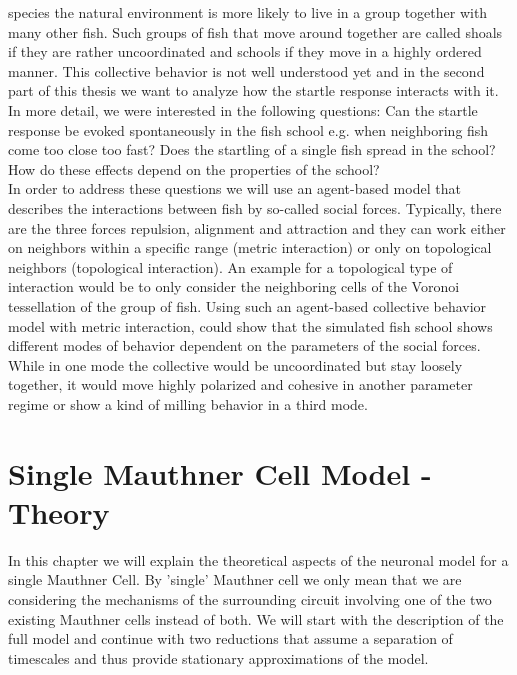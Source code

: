 \documentclass[a4paper,10pt,hidelinks]{scrreprt}
\begin{document}
	species the natural environment is more likely to live in a group together with many other fish.
	Such groups of fish that move around together are called shoals if they are rather 
	uncoordinated and schools if they move in a highly ordered manner.
	This collective behavior is not well understood yet and in the second part of this thesis we 
	want to analyze how the startle response interacts with it.
	In more detail, we were interested in the following questions:
	Can the startle response be evoked spontaneously in the fish school e.g. when neighboring fish 
	come too close too fast?
	Does the startling of a single fish spread in the school?
	How do these effects depend on the properties of the school?\\
	In order to address these questions we will use an agent-based model that describes the 
	interactions between fish by so-called social forces.
	Typically, there are the three forces repulsion, alignment and attraction and they can work 
	either on neighbors within a specific range (metric interaction) or only on topological 
	neighbors (topological interaction).
	An example for a topological type of interaction would be to only consider the neighboring 
	cells of the Voronoi tessellation of the group of fish.
	Using such an agent-based collective behavior model with metric interaction, \cite{Couzin2002} 
	could show that the simulated fish school shows different modes of behavior dependent on the 
	parameters of the social forces.
	While in one mode the collective would be uncoordinated but stay loosely together, it would 
	move highly polarized and cohesive in another parameter regime or show a kind of milling 
	behavior in a third mode.
	\chapter{Single Mauthner Cell Model - Theory}
	In this chapter we will explain the theoretical aspects of the neuronal model for a single 
	Mauthner Cell.
	By 'single' Mauthner cell we only mean that we are considering the mechanisms of the 
	surrounding circuit involving one of the two existing Mauthner cells instead of both.
	We will start with the description of the full model and continue with two reductions that 
	assume a separation of timescales and thus provide stationary approximations of the model.
\end{document}
